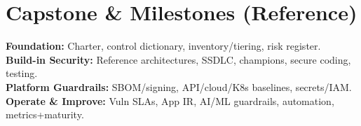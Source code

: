 \documentclass[11pt,a4paper]{article}
\begin{document}
\section*{Capstone \& Milestones (Reference)}
\textbf{Foundation:} Charter, control dictionary, inventory/tiering, risk register.\\
\textbf{Build-in Security:} Reference architectures, SSDLC, champions, secure coding, testing.\\
\textbf{Platform Guardrails:} SBOM/signing, API/cloud/K8s baselines, secrets/IAM.\\
\textbf{Operate \& Improve:} Vuln SLAs, App IR, AI/ML guardrails, automation, metrics+maturity.
\end{document}
